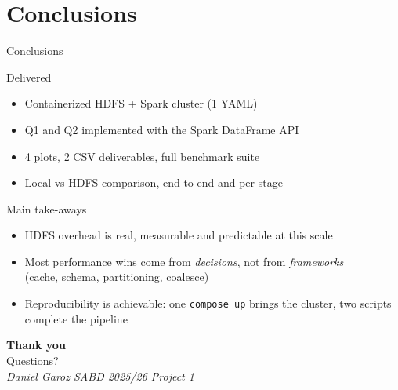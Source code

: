 \documentclass[aspectratio=169]{beamer}
\begin{document}
\section{Conclusions}
\begin{frame}{Conclusions}
\begin{block}{Delivered}
\begin{itemize}
    \item Containerized HDFS + Spark cluster (1 YAML)
    \item Q1 and Q2 implemented with the Spark DataFrame API
    \item 4 plots, 2 CSV deliverables, full benchmark suite
    \item Local vs HDFS comparison, end-to-end and per stage
\end{itemize}
\end{block}

\begin{block}{Main take-aways}
\begin{itemize}
    \item HDFS overhead is real, measurable and predictable at this scale
    \item Most performance wins come from \emph{decisions}, not from \emph{frameworks}\\
          (cache, schema, partitioning, coalesce)
    \item Reproducibility is achievable: one \texttt{compose up} brings
          the cluster, two scripts complete the pipeline
\end{itemize}
\end{block}

\end{frame}

\begin{frame}
\centering
\Huge\textbf{Thank you}\\
\vspace{1em}
\Large Questions?\\
\vspace{2em}
\normalsize
\textit{Daniel Garoz \textendash{} SABD 2025/26 \textendash{} Project 1}

\end{frame}
\end{document}
